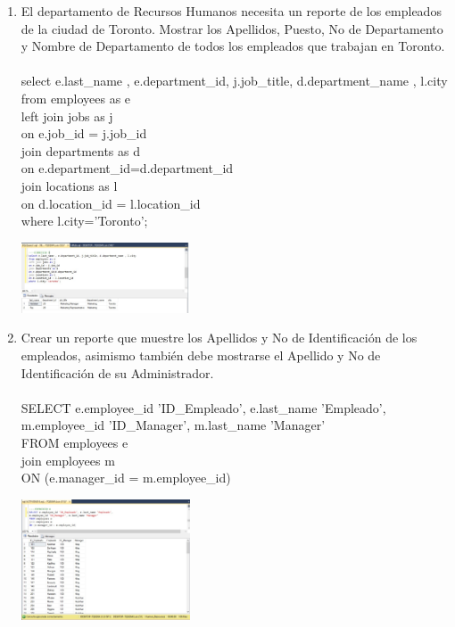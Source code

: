 \begin{enumerate}[1.]
	\item El departamento de Recursos Humanos necesita un reporte de los empleados de la ciudad de Toronto. Mostrar los Apellidos, Puesto, No de Departamento y Nombre de Departamento de todos los empleados que trabajan en Toronto.
	\\
	\\select e.last\_name , e.department\_id, j.job\_title, d.department\_name , l.city 
	\\from employees as e 
	\\left join jobs as j 
	\\on e.job\_id = j.job\_id
	\\join departments as d
	\\on e.department\_id=d.department\_id
	\\join locations as l 
	\\on d.location\_id = l.location\_id
	\\where l.city='Toronto';

	\begin{center}
	\includegraphics[width=5cm]{./Imagenes/8ejer3} 
	\end{center}

	\item Crear un reporte que muestre los Apellidos y No de Identificación de los empleados, asimismo también debe mostrarse el Apellido y No de Identificaci\'on de su Administrador.
	\\
	\\SELECT e.employee\_id 'ID\_Empleado', e.last\_name 'Empleado', 
	\\m.employee\_id 'ID\_Manager', m.last\_name 'Manager' 
	\\FROM employees e 
	\\join employees m 
	\\ON (e.manager\_id = m.employee\_id)


	\begin{center}
	\includegraphics[width=5cm]{./Imagenes/8ejer4} 
	\end{center}


\end{enumerate}

